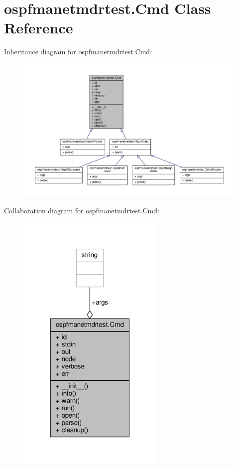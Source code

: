 \hypertarget{classospfmanetmdrtest_1_1_cmd}{\section{ospfmanetmdrtest.\+Cmd Class Reference}
\label{classospfmanetmdrtest_1_1_cmd}
}


Inheritance diagram for ospfmanetmdrtest.\+Cmd\+:
\nopagebreak
\begin{figure}[H]
\begin{center}
\leavevmode
\includegraphics[width=350pt]{classospfmanetmdrtest_1_1_cmd__inherit__graph}
\end{center}
\end{figure}


Collaboration diagram for ospfmanetmdrtest.\+Cmd\+:
\nopagebreak
\begin{figure}[H]
\begin{center}
\leavevmode
\includegraphics[width=199pt]{classospfmanetmdrtest_1_1_cmd__coll__graph}
\end{center}
\end{figure}
